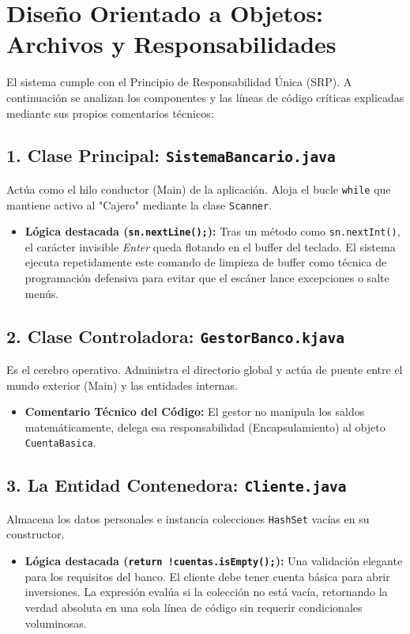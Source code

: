 \documentclass[12pt, letterpaper]{article}
\begin{document}
	\section{Diseño Orientado a Objetos: Archivos y Responsabilidades}
	El sistema cumple con el Principio de Responsabilidad Única (SRP). A continuación se analizan los componentes y las líneas de código críticas explicadas mediante sus propios comentarios técnicos:
	
	\subsection{1. Clase Principal: \texttt{SistemaBancario.java}}
	Actúa como el hilo conductor (Main) de la aplicación. Aloja el bucle \texttt{while} que mantiene activo al "Cajero" mediante la clase \texttt{Scanner}.
	\begin{itemize}
		\item \textbf{Lógica destacada (\texttt{sn.nextLine();}):} Tras un método como \texttt{sn.nextInt()}, el carácter invisible \textit{Enter} queda flotando en el buffer del teclado. El sistema ejecuta repetidamente este comando de limpieza de buffer como técnica de programación defensiva para evitar que el escáner lance excepciones o salte menús.
	\end{itemize}
	
	\subsection{2. Clase Controladora: \texttt{GestorBanco.kjava}}
	Es el cerebro operativo. Administra el directorio global y actúa de puente entre el mundo exterior (Main) y las entidades internas. 
	\begin{itemize}
		\item \textbf{Comentario Técnico del Código:} El gestor no manipula los saldos matemáticamente, delega esa responsabilidad (Encapsulamiento) al objeto \texttt{CuentaBasica}.
	\end{itemize}
	
	\subsection{3. La Entidad Contenedora: \texttt{Cliente.java}}
	Almacena los datos personales e instancia colecciones \texttt{HashSet} vacías en su constructor.
	\begin{itemize}
		\item \textbf{Lógica destacada (\texttt{return !cuentas.isEmpty();}):} Una validación elegante para los requisitos del banco. El cliente debe tener cuenta básica para abrir inversiones. La expresión evalúa si la colección no está vacía, retornando la verdad absoluta en una sola línea de código sin requerir condicionales voluminosas.
	\end{itemize}
	
\end{document}
